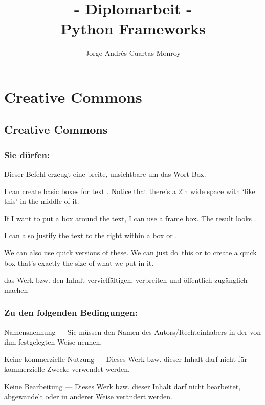 \documentclass[titlepage, 12pt,a4paper]{scrreprt}
\author{Jorge Andrés Cuartas Monroy}
\title{- Diplomarbeit - \\ Python Frameworks \\}
\begin{document}
\maketitle
\newpage

\chapter*{Creative Commons}
\section*{Creative Commons}
\subsection*{Sie dürfen:}
 Dieser Befehl erzeugt eine breite, unsichtbare 
   um das Wort Box.

I can create basic boxes for text . Notice
that there's a 2in wide space with `like this' in the middle of it.

If I want to put a box around the text, I can use a frame box. The
result looks .

I can also justify the text to the right within a box
 or .

We can also use quick versions of these. We can just \mbox{do this}
or  to create a quick box that's exactly the size of what we put in it.



das Werk bzw. den Inhalt vervielfältigen, verbreiten und öffentlich zugänglich machen
\subsection*{Zu den folgenden Bedingungen:}
Namensnennung — Sie müssen den Namen des Autors/Rechteinhabers in der von ihm festgelegten Weise nennen.

Keine kommerzielle Nutzung — Dieses Werk bzw. dieser Inhalt darf nicht für kommerzielle Zwecke verwendet werden.

Keine Bearbeitung — Dieses Werk bzw. dieser Inhalt darf nicht bearbeitet, abgewandelt oder in anderer Weise verändert werden.
\end{document}
